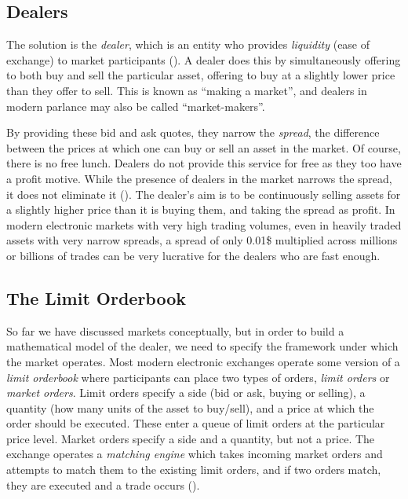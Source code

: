 \subsection*{Dealers} 
The solution is the \textit{dealer}, which is an entity who provides \textit{liquidity}
(ease of exchange) to market participants (\cite{trading}). A dealer does this by 
simultaneously offering to both buy and sell the particular asset, offering to buy at a 
slightly lower price than they offer to sell. This is known as ``making a market'', and 
dealers in modern parlance may also be called ``market-makers''.

By providing these bid and ask quotes, they narrow the \textit{spread}, the difference 
between the prices at which one can buy or sell an asset in the market. 
Of course, there is no free lunch. Dealers do not provide this service for free as they 
too have a profit motive. While the presence of dealers in the market narrows the spread, 
it does not eliminate it (\cite{trading}). 
The dealer's aim is to be continuously selling assets for a slightly higher price 
than it is buying them, and taking the spread as profit. In modern electronic markets 
with very high trading volumes, even in heavily traded assets with very narrow 
spreads, a spread of only 0.01\$ multiplied across millions or billions of trades 
can be very lucrative for the dealers who are fast enough.

\subsection*{The Limit Orderbook}
So far we have discussed markets conceptually, but in order to build a 
mathematical model of the dealer, we need to specify the framework under which the 
market operates. Most modern electronic exchanges 
operate some version of a \textit{limit orderbook} where participants can place two 
types of orders, \textit{limit orders} or \textit{market orders}. 
Limit orders specify a side (bid or ask, buying or selling), a quantity (how 
many units of the asset to buy/sell), and a price at which the order should be 
executed. These enter a queue of limit orders at the particular price level. Market 
orders specify a side and a quantity, but not a price. The exchange operates a 
\textit{matching engine} which takes incoming market orders and attempts to match 
them to the existing limit orders, and if two orders match, they are executed and a 
trade occurs (\cite{trading}). 

